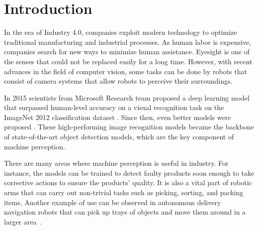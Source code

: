 \chapter{Introduction}

In the era of Industry 4.0, companies exploit modern technology to optimize traditional manufacturing and industrial processes. As human labor is expensive, companies search for new ways to minimize human assistance. Eyesight is one of the senses that could not be replaced easily for a long time. However, with recent advances in the field of computer vision, some tasks can be done by robots that consist of camera systems that allow robots to perceive their surroundings. 

In 2015 scientists from Microsoft Research team proposed a deep learning model that surpassed human-level accuracy on a visual recognition task on the ImageNet 2012 classification dataset \cite{surp2015}. Since then, even better models were proposed \cite{resnet, efficientnet}. These high-performing image recognition models became the backbone of state-of-the-art object detection models, which are the key component of machine perception.

There are many areas where machine perception is useful in industry. For instance, the models can be trained to detect faulty products soon enough to take corrective actions to ensure the products' quality. It is also a vital part of robotic arms that can carry out non-trivial tasks such as picking, sorting, and packing items. Another example of use can be observed in autonomous delivery navigation robots that can pick up trays of objects and move them around in a larger area~\cite{bmw}. 